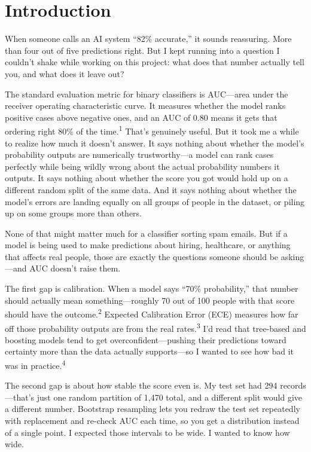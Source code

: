 \documentclass[12pt]{article}
\begin{document}
\newpage

\section{Introduction}

When someone calls an AI system ``82\% accurate,'' it sounds reassuring. More
than four out of five predictions right. But I kept running into a question
I couldn't shake while working on this project: what does that number actually
tell you, and what does it leave out?

The standard evaluation metric for binary classifiers is AUC---area under the
receiver operating characteristic curve. It measures whether the model ranks
positive cases above negative ones, and an AUC of 0.80 means it gets that
ordering right 80\% of the time.\textsuperscript{1} That's genuinely useful.
But it took me a while to realize how much it doesn't answer. It says nothing
about whether the model's probability outputs are numerically trustworthy---a
model can rank cases perfectly while being wildly wrong about the actual
probability numbers it outputs. It says nothing about whether the score you
got would hold up on a different random split of the same data. And it says
nothing about whether the model's errors are landing equally on all groups
of people in the dataset, or piling up on some groups more than others.

None of that might matter much for a classifier sorting spam emails. But if
a model is being used to make predictions about hiring, healthcare, or
anything that affects real people, those are exactly the questions someone
should be asking---and AUC doesn't raise them.

The first gap is calibration. When a model says ``70\% probability,'' that
number should actually mean something---roughly 70 out of 100 people with
that score should have the outcome.\textsuperscript{2} Expected Calibration
Error (ECE) measures how far off those probability outputs are from the real
rates.\textsuperscript{3} I'd read that tree-based and boosting models tend
to get overconfident---pushing their predictions toward certainty more than
the data actually supports---so I wanted to see how bad it was in
practice.\textsuperscript{4}

The second gap is about how stable the score even is. My test set had 294
records---that's just one random partition of 1,470 total, and a different
split would give a different number. Bootstrap resampling lets you redraw
the test set repeatedly with replacement and re-check AUC each time, so
you get a distribution instead of a single point. I expected those
intervals to be wide. I wanted to know how wide.
\end{document}

